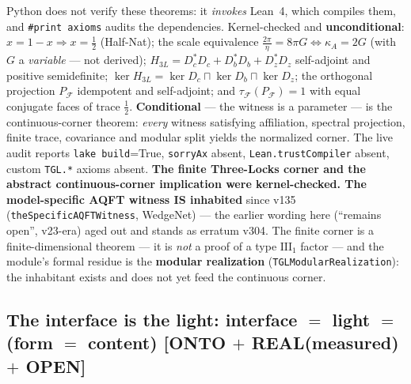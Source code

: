 \documentclass[11pt]{article}
\theoremstyle{definition}\newtheorem{deriv}{Derivation}
\begin{document}
Python does not verify these theorems: it \emph{invokes} Lean~4, which compiles them, and \texttt{\#print axioms} audits the dependencies. Kernel-checked and \textbf{unconditional}: $x=1-x\Rightarrow x=\tfrac12$ (Half-Nat); the scale equivalence $\tfrac{2\pi}{\eta}=8\pi G\iff\kappa_A=2G$ (with $G$ a \emph{variable} --- not derived); $H_{3L}=D_c^{*}D_c+D_b^{*}D_b+D_z^{*}D_z$ self-adjoint and positive semidefinite; $\ker H_{3L}=\ker D_c\sqcap\ker D_b\sqcap\ker D_z$; the orthogonal projection $P_{\mathcal F}$ idempotent and self-adjoint; and $\tau_{\mathcal F}(P_{\mathcal F})=1$ with equal conjugate faces of trace $\tfrac12$. \textbf{Conditional} --- the witness is a parameter --- is the continuous-corner theorem: \emph{every} witness satisfying affiliation, spectral projection, finite trace, covariance and modular split yields the normalized corner. The live audit reports \texttt{lake build}=True, \texttt{sorryAx} absent, \texttt{Lean.trustCompiler} absent, custom \texttt{TGL.*} axioms absent. \textbf{The finite Three-Locks corner and the abstract continuous-corner implication were kernel-checked. The model-specific AQFT witness IS inhabited} since v135 (\texttt{theSpecificAQFTWitness}, WedgeNet) --- the earlier wording here (``remains open'', v23-era) aged out and stands as erratum v304. The finite corner is a finite-dimensional theorem --- it is \emph{not} a proof of a type $\mathrm{III}_1$ factor --- and the module's formal residue is the \textbf{modular realization} (\texttt{TGLModularRealization}): the inhabitant exists and does not yet feed the continuous corner.

\subsection*{The interface is the light: interface $=$ light $=$ (form $=$ content) \textsf{[ONTO $+$ REAL(measured) $+$ OPEN]}}
\end{document}
